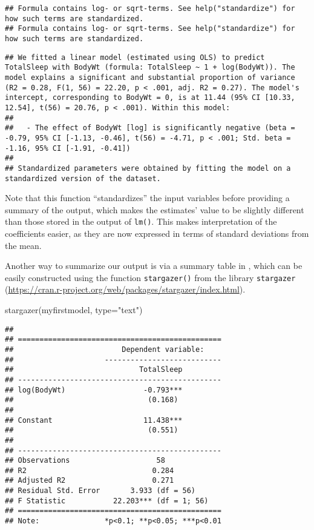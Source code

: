 \documentclass[
]{book}
\newenvironment{Shaded}{\begin{snugshade}}{\end{snugshade}}
\newcommand{\AttributeTok}[1]{\textcolor[rgb]{0.77,0.63,0.00}{#1}}
\newcommand{\FunctionTok}[1]{\textcolor[rgb]{0.00,0.00,0.00}{#1}}
\newcommand{\NormalTok}[1]{#1}
\newcommand{\StringTok}[1]{\textcolor[rgb]{0.31,0.60,0.02}{#1}}
\begin{document}
\begin{verbatim}
## Formula contains log- or sqrt-terms. See help("standardize") for how such terms are standardized.
## Formula contains log- or sqrt-terms. See help("standardize") for how such terms are standardized.
\end{verbatim}

\begin{verbatim}
## We fitted a linear model (estimated using OLS) to predict TotalSleep with BodyWt (formula: TotalSleep ~ 1 + log(BodyWt)). The model explains a significant and substantial proportion of variance (R2 = 0.28, F(1, 56) = 22.20, p < .001, adj. R2 = 0.27). The model's intercept, corresponding to BodyWt = 0, is at 11.44 (95% CI [10.33, 12.54], t(56) = 20.76, p < .001). Within this model:
## 
##   - The effect of BodyWt [log] is significantly negative (beta = -0.79, 95% CI [-1.13, -0.46], t(56) = -4.71, p < .001; Std. beta = -1.16, 95% CI [-1.91, -0.41])
## 
## Standardized parameters were obtained by fitting the model on a standardized version of the dataset.
\end{verbatim}

Note that this function ``standardizes'' the input variables before providing a summary of the output, which makes the estimates' value to be slightly different than those stored in the output of \texttt{lm()}. This makes interpretation of the coefficients easier, as they are now expressed in terms of standard deviations from the mean.

Another way to summarize our output is via a summary table in , which can be easily constructed using the function \texttt{stargazer()} from the library \texttt{stargazer} (\url{https://cran.r-project.org/web/packages/stargazer/index.html}).

\begin{Shaded}
\begin{Highlighting}[]
\FunctionTok{stargazer}\NormalTok{(myfirstmodel, }\AttributeTok{type=}\StringTok{"text"}\NormalTok{)}
\end{Highlighting}
\end{Shaded}

\begin{verbatim}
## 
## ===============================================
##                         Dependent variable:    
##                     ---------------------------
##                             TotalSleep         
## -----------------------------------------------
## log(BodyWt)                  -0.793***         
##                               (0.168)          
##                                                
## Constant                     11.438***         
##                               (0.551)          
##                                                
## -----------------------------------------------
## Observations                    58             
## R2                             0.284           
## Adjusted R2                    0.271           
## Residual Std. Error       3.933 (df = 56)      
## F Statistic           22.203*** (df = 1; 56)   
## ===============================================
## Note:               *p<0.1; **p<0.05; ***p<0.01
\end{verbatim}
\end{document}
